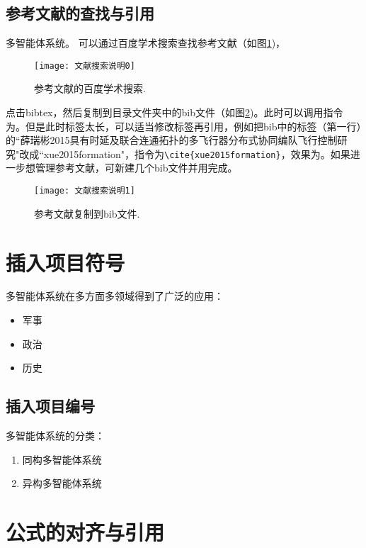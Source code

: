 \documentclass[master]{hdu-thesis}
\begin{document}
\subsection{参考文献的查找与引用}


多智能体系统\citep{cao2011formation}。
可以通过百度学术搜索查找参考文献（如图\ref{fig_search0})，
 \begin{figure}[!htb]
  \centering
  \texttt{[image: 文献搜索说明0]}
  \caption{参考文献的百度学术搜索.}
  \label{fig_search0}
\end{figure}
点击bibtex，然后复制到目录文件夹中的bib文件（如图\ref{fig_search1})。此时可以调用指令为\citep{薛瑞彬2015具有时延及联合连通拓扑的多飞行器分布式协同编队飞行控制研究}。但是此时标签太长，可以适当修改标签再引用，例如把bib中的标签（第一行）的``薛瑞彬2015具有时延及联合连通拓扑的多飞行器分布式协同编队飞行控制研究"改成``xue2015formation"，指令为\verb+\cite{xue2015formation}+，效果为\cite{xue2015formation}。如果进一步想管理参考文献，可新建几个bib文件并用\verb++完成。
 \begin{figure}[!htb]
  \centering
  \texttt{[image: 文献搜索说明1]}
  \caption{参考文献复制到bib文件.}
  \label{fig_search1}
\end{figure}



\section{插入项目符号}

多智能体系统在多方面多领域得到了广泛的应用：
\begin{itemize}
  \item 军事
  \item 政治
  \item 历史
\end{itemize}

\subsection{插入项目编号}

多智能体系统的分类：
\begin{enumerate}
  \item 同构多智能体系统
  \item 异构多智能体系统
\end{enumerate}




\section{公式的对齐与引用}
\end{document}
